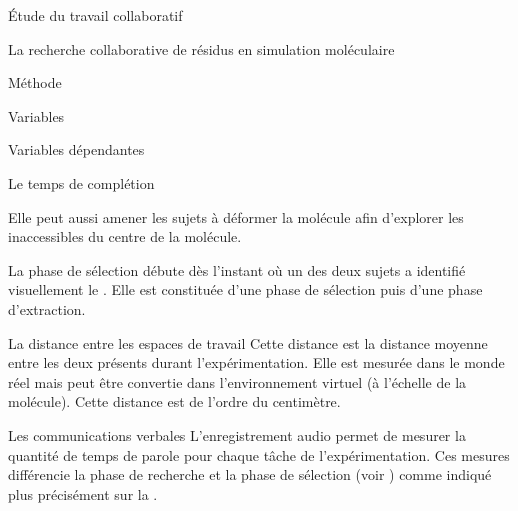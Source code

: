 \documentclass[myfrancais]{mythesis}
\begin{document}
\begin{mypart}{Étude du travail collaboratif}
\begin{mychapter}{La recherche collaborative de résidus en simulation moléculaire}
\begin{mysection}{Méthode}
\begin{mysubsection}{Variables}
\begin{mysubsubsection}{Variables dépendantes}
\begin{myparagraph}{ Le temps de complétion}
\begin{description}
									Elle peut aussi amener les sujets à déformer la molécule afin d'explorer les  inaccessibles du centre de la molécule.
								\item[La sélection] La phase de sélection débute dès l'instant où un des deux sujets a identifié visuellement le .
									Elle est constituée d'une phase de sélection puis d'une phase d'extraction.
							\end{description}
						\end{myparagraph}
						\begin{myparagraph}{ La distance entre les espaces de travail}
							Cette distance est la distance moyenne entre les deux  présents durant l'expérimentation.
							Elle est mesurée dans le monde réel mais peut être convertie dans l'environnement virtuel (à l'échelle de la molécule).
							Cette distance est de l'ordre du centimètre.
						\end{myparagraph}
						\begin{myparagraph}{ Les communications verbales}
							L'enregistrement audio permet de mesurer la quantité de temps de parole pour chaque tâche de l'expérimentation.
							Ces mesures différencie la phase de recherche et la phase de sélection (voir ) comme indiqué plus précisément sur la .


\end{myparagraph}
\end{mysubsubsection}
\end{mysubsection}
\end{mysection}
\end{mychapter}
\end{mypart}
\end{document}
